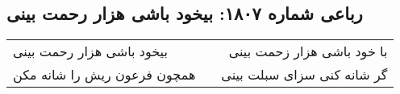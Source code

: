 \begin{center}
\section*{رباعی شماره ۱۸۰۷: بیخود باشی هزار رحمت بینی}
\label{sec:1807}
\begin{longtable}{l p{0.5cm} r}
بیخود باشی هزار رحمت بینی
&&
با خود باشی هزار زحمت بینی
\\
همچون فرعون ریش را شانه مکن
&&
گر شانه کنی سزای سبلت بینی
\\
\end{longtable}
\end{center}
